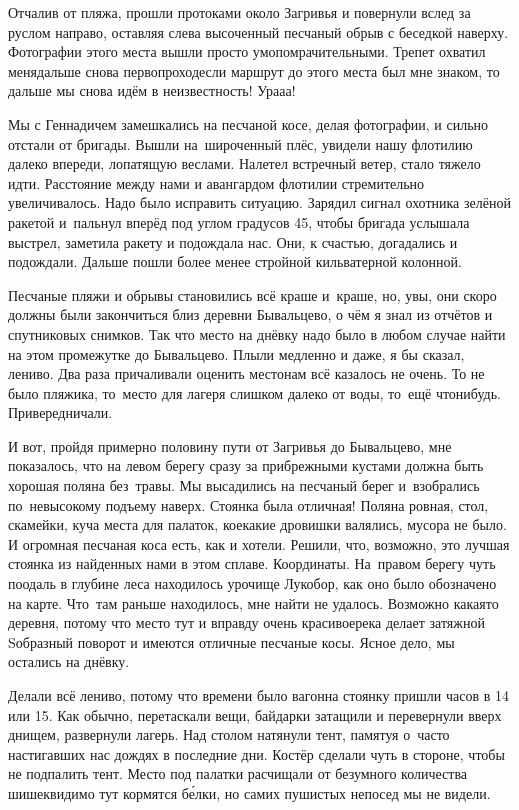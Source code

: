 Отчалив от пляжа, прошли протоками около Загривья и повернули вслед за руслом направо, оставляя слева высоченный песчаный обрыв с беседкой наверху. Фотографии этого места вышли просто умопомрачительными. Трепет охватил меня\mdash дальше снова первопроход\mdash если маршрут до этого места был мне знаком, то дальше мы снова идём в неизвестность! Ура\sdash а\sdash а!

Мы с Геннадичем замешкались на песчаной косе, делая фотографии, и сильно отстали от бригады. Вышли на~широченный плёс, увидели нашу флотилию далеко впереди, лопатящую веслами. Налетел встречный ветер, стало тяжело идти. Расстояние между нами и авангардом флотилии стремительно увеличивалось. Надо было исправить ситуацию. Зарядил сигнал охотника зелёной ракетой и~пальнул вперёд под углом градусов 45, чтобы бригада услышала выстрел, заметила ракету и подождала нас. Они, к счастью, догадались и подождали. Дальше пошли более менее стройной кильватерной колонной.

Песчаные пляжи и обрывы становились всё краше и~краше, но, увы, они скоро должны были закончиться близ деревни Бывальцево, о чём я знал из отчётов и спутниковых снимков. Так что место на днёвку надо было в любом случае найти на этом промежутке до Бывальцево. Плыли медленно и даже, я бы сказал, лениво. Два раза причаливали оценить место\mdash нам всё казалось не очень. То не было пляжика, то~место для лагеря слишком далеко от воды, то~ещё что\sdash нибудь. Привередничали.

И вот, пройдя примерно половину пути от Загривья до Бывальцево, мне показалось, что на левом берегу сразу за прибрежными кустами должна быть хорошая поляна без~травы. Мы высадились на песчаный берег и~взобрались по~невысокому подъему наверх. Стоянка была отличная! Поляна ровная, стол, скамейки, куча места для палаток, кое\sdash какие дровишки валялись, мусора не было. И огромная песчаная коса есть, как и хотели. Решили, что, возможно, это лучшая стоянка из найденных нами в этом сплаве. Координаты\mdash \CoordsChagodoschaSixteenDnevka. На~правом берегу чуть поодаль в глубине леса находилось урочище Лукобор, как оно было обозначено на карте. Что~там раньше находилось, мне найти не удалось. Возможно какая\sdash то деревня, потому что место тут и вправду очень красивое\mdash река делает затяжной S\sdash образный поворот и имеются отличные песчаные косы.  Ясное дело, мы остались на днёвку.

Делали всё лениво, потому что времени было вагон\mdash на стоянку пришли часов в 14 или 15. Как обычно, перетаскали вещи, байдарки затащили и перевернули вверх днищем, развернули лагерь. Над столом натянули тент, памятуя о~часто настигавших нас дождях в последние дни. Костёр сделали чуть в стороне, чтобы не подпалить тент. Место под палатки расчищали от безумного количества шишек\mdash видимо тут кормятся б\'{е}лки, но самих пушистых непосед мы не видели. 

